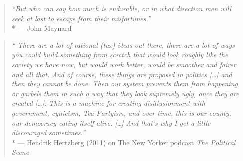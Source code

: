 \begin{quote}
	\emph{``But who can say how much is endurable, or in what direction men will seek at last to escape from their misfortunes.''}
	\\*
	--- John Maynard \citet{Keynes1936}
\end{quote}

\begin{quote}
	\emph{``
	There are a lot of rational (tax) ideas out there, there are a lot of ways you could build something from scratch that would look roughly like the society we have now, but would work better, would be smoother and fairer and all that.
	And of course, these things are proposed in politics [\ldots] and then they cannot be done.
	Then our system prevents them from happening or garbels them in such a way that they look supremely ugly, once they are created [\ldots].
	This is a machine for creating disillusionment with government, cynicism, Tea-Partyism, and over time, this is our county, our democracy eating itself alive.
	[\ldots]
	And that's why I get a little discouraged sometimes.''}
	\\*
	--- Hendrik Hertzberg (2011) on The New Yorker podcast \emph{The Political Scene}
\end{quote}


